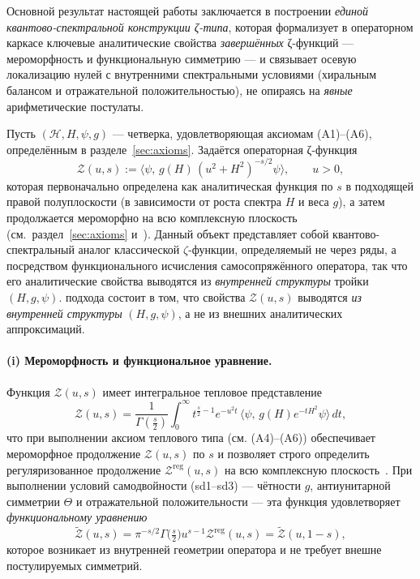 \documentclass{article}
\numberwithin{equation}{section}
\theoremstyle{plain}
\theoremstyle{definition}
\theoremstyle{remark}
\def\infty{∞}\def\partial{∂}\def\sum{Σ}\def\int{∫}%
\begin{document}
\noindent
Основной результат настоящей работы заключается в построении \emph{единой квантово-спектральной конструкции ζ-типа},
которая формализует в операторном каркасе ключевые аналитические свойства \emph{завершённых} ζ-функций —
мероморфность и функциональную симметрию — и связывает осевую локализацию нулей с внутренними спектральными
условиями (хиральным балансом и отражательной положительностью), не опираясь на \emph{явные} арифметические постулаты.

\medskip
\noindent
Пусть $(\mathcal H,H,\psi,g)$ — четверка, удовлетворяющая аксиомам (A1)–(A6), определённым в разделе~\ref{sec:axioms}.
Задаётся операторная ζ-функция
\begin{equation}
\mathcal Z(u,s)
:=\langle\psi,\,g(H)\,(u^2+H^2)^{-s/2}\psi\rangle,
\qquad u>0,
\end{equation}
которая первоначально определена как аналитическая функция по $s$ в подходящей правой полуплоскости
(в зависимости от роста спектра $H$ и веса $g$), а затем продолжается мероморфно на всю комплексную плоскость
(см.~раздел~\ref{sec:axioms} и~\cite{Seeley1967}).
Данный объект представляет собой квантово-спектральный аналог классической $\zeta$-функции,
определяемый не через ряды, а посредством функционального исчисления самосопряжённого оператора,
так что его аналитические свойства выводятся из \emph{внутренней структуры} тройки $(H,g,\psi)$.
подхода состоит в том, что свойства $\mathcal Z(u,s)$ выводятся \emph{из внутренней структуры} $(H,g,\psi)$, а не из внешних аналитических аппроксимаций.

\paragraph{(i) Мероморфность и функциональное уравнение.}
Функция $\mathcal Z(u,s)$ имеет интегральное тепловое представление
\begin{equation}
\mathcal Z(u,s)
=\frac{1}{\Gamma(\tfrac s2)}
\int_0^\infty t^{\frac s2-1}e^{-u^2 t}\,\langle\psi,\,g(H)e^{-tH^2}\psi\rangle\,dt,
\end{equation}
что при выполнении аксиом теплового типа (см. (A4)–(A6)) обеспечивает мероморфное продолжение $\mathcal Z(u,s)$ по $s$ и позволяет строго определить регуляризованное продолжение $\mathcal Z^{\mathrm{reg}}(u,s)$ на всю комплексную плоскость~\cite{Seeley1967}.
При выполнении условий самодвойности (sd1–sd3) — чётности $g$, антиунитарной симметрии $\Theta$ и отражательной положительности — эта функция удовлетворяет \emph{функциональному уравнению}
\begin{equation}
\widetilde{\mathcal Z}(u,s)
=\pi^{-s/2}\Gamma\!\big(\tfrac s2\big)u^{s-1}\mathcal Z^{\mathrm{reg}}(u,s)
=\widetilde{\mathcal Z}(u,1-s),
\end{equation}
которое возникает из внутренней геометрии оператора и не требует внешне постулируемых симметрий.
\end{document}

